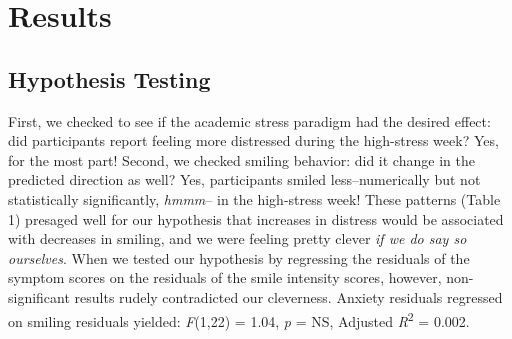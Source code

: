 \documentclass[authordate, empirical]{jote-new-article}
\begin{document}





\section{Results}







\subsection{Hypothesis Testing}



First, we checked to see if the academic stress paradigm had the desired effect: did participants report feeling more distressed during the high-stress week? Yes, for the most part! Second, we checked smiling behavior: did it change in the predicted direction as well? Yes, participants smiled less--numerically but not statistically significantly, \emph{hmmm}-- in the high-stress week! These patterns (Table 1) presaged well for our hypothesis that increases in distress would be associated with decreases in smiling, and we were feeling pretty clever \emph{if we do say so ourselves}. When we tested our hypothesis by regressing the residuals of the symptom scores on the residuals of the smile intensity scores, however, non-significant results rudely contradicted our cleverness. Anxiety residuals regressed on smiling residuals yielded: \emph{F}(1,22) = 1.04, \emph{p} = NS, Adjusted \emph{R}\textsuperscript{2} = 0.002.
\end{document}
